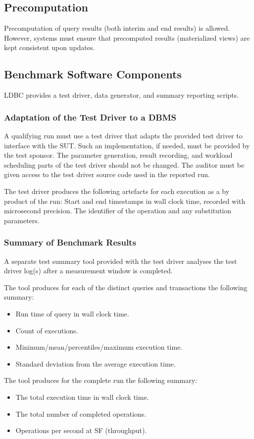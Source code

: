 \subsection{Precomputation}

Precomputation of query results (both interim and end results) is allowed. However, systems must ensure that precomputed results (\eg materialized views) are kept consistent upon updates.

\subsection{Benchmark Software Components}
\label{sec:snb-software-components}
LDBC provides a test driver, data generator, and summary reporting scripts. 

\subsubsection{Adaptation of the Test Driver to a DBMS}
\label{sec:test-driver}
A qualifying run must use a test driver that adapts the provided test driver to interface with the SUT. Such an implementation, if needed, must be provided by the test sponsor. The parameter generation, result recording, and workload scheduling parts of the test driver should not be changed. The auditor must be given access to the test driver source code used in the reported run.

The test driver produces the following artefacts for each execution as a by product of the run: Start and end timestamps in wall clock time, recorded with microsecond precision. The identifier of the operation and any substitution parameters.


\subsubsection{Summary of Benchmark Results}
\label{sec:performance-metrics}
A separate test summary tool provided with the test driver analyses the test driver log(s) after a measurement window is completed. 

The tool produces for each of the distinct queries and transactions the following summary:
\begin{itemize}
    \item Run time of query in wall clock time.
    \item Count of executions.
    \item Minimum/mean/percentiles/maximum execution time.
    \item Standard deviation from the average execution time.
\end{itemize}
The tool produces for the complete run the following summary:
\begin{itemize}
    \item The total execution time in wall clock time.
    \item The total number of completed operations.
    \item Operations per second at SF (throughput).
\end{itemize}


